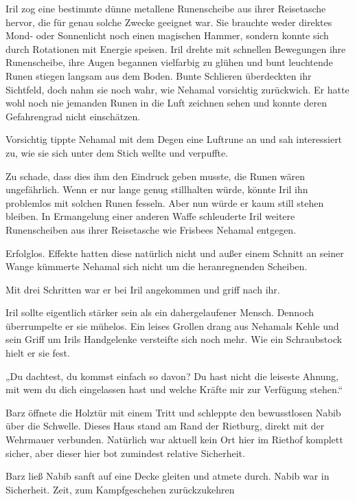 Iril zog eine bestimmte dünne metallene Runenscheibe aus ihrer Reisetasche hervor, die für genau solche Zwecke geeignet war. Sie brauchte weder direktes Mond- oder Sonnenlicht noch einen magischen Hammer, sondern konnte sich durch Rotationen mit Energie speisen. Iril drehte mit schnellen Bewegungen ihre Runenscheibe, ihre Augen begannen vielfarbig zu glühen und bunt leuchtende Runen stiegen langsam aus dem Boden. Bunte Schlieren überdeckten ihr Sichtfeld, doch nahm sie noch wahr, wie Nehamal vorsichtig zurückwich. Er hatte wohl noch nie jemanden Runen in die Luft zeichnen sehen und konnte deren Gefahrengrad nicht einschätzen.

Vorsichtig tippte Nehamal mit dem Degen eine Luftrune an und sah interessiert zu, wie sie sich unter dem Stich wellte und verpuffte.

Zu schade, dass dies ihm den Eindruck geben musste, die Runen wären ungefährlich. Wenn er nur lange genug stillhalten würde, könnte Iril ihn problemlos mit solchen Runen fesseln. Aber nun würde er kaum still stehen bleiben. In Ermangelung einer anderen Waffe schleuderte Iril weitere Runenscheiben aus ihrer Reisetasche wie Frisbees Nehamal entgegen.

Erfolglos. Effekte hatten diese natürlich nicht und außer einem Schnitt an seiner Wange kümmerte Nehamal sich nicht um die heranregnenden Scheiben.

Mit drei Schritten war er bei Iril angekommen und griff nach ihr.

Iril sollte eigentlich stärker sein als ein dahergelaufener Mensch. Dennoch überrumpelte er sie mühelos. Ein leises Grollen drang aus Nehamals Kehle und sein Griff um Irils Handgelenke versteifte sich noch mehr. Wie ein Schraubstock hielt er sie fest.

„Du dachtest, du kommst einfach so davon? Du hast nicht die leiseste Ahnung, mit wem du dich eingelassen hast und welche Kräfte mir zur Verfügung stehen.“\bigskip







Barz öffnete die Holztür mit einem Tritt und schleppte den bewusstlosen Nabib über die Schwelle. Dieses Haus stand am Rand der Rietburg, direkt mit der Wehrmauer verbunden. Natürlich war aktuell kein Ort hier im Riethof komplett sicher, aber dieser hier bot zumindest relative Sicherheit.

Barz ließ Nabib sanft auf eine Decke gleiten und atmete durch. Nabib war in Sicherheit. Zeit, zum Kampfgeschehen zurückzukehren


